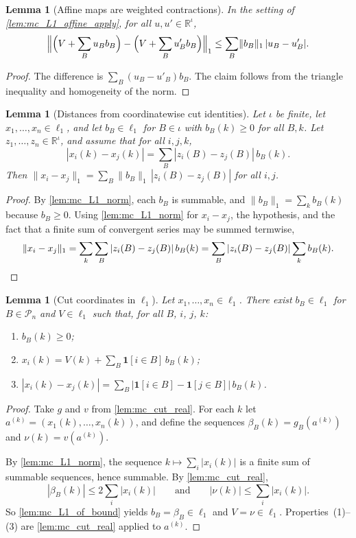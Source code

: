 \documentclass[11pt]{article}
\newtheorem{lemma}[theorem]{Lemma}
\theoremstyle{definition}
\theoremstyle{remark}
\newcommand{\R}{\mathbb{R}}
\newcommand{\Pn}{\mathcal{P}_n}
\newcommand{\one}{\mathbf{1}}
\newcommand{\lnorm}[1]{\lVert #1\rVert_{1}}
\begin{document}
\begin{lemma}[Affine maps are weighted contractions]\label{lem:mc_L1_affine_contr}
In the setting of \cref{lem:mc_L1_affine_apply}, for all $u,u'\in\R^\iota$,
\[
\Bigl\|\Bigl(V+\sum_Bu_Bb_B\Bigr)-\Bigl(V+\sum_Bu'_Bb_B\Bigr)\Bigr\|_1\le\sum_B\lnorm{b_B}\,|u_B-u'_B| .
\]
\end{lemma}
\begin{proof}
The difference is $\sum_B(u_B-u'_B)b_B$. The claim follows from the triangle inequality and homogeneity of the norm.
\end{proof}

\begin{lemma}[Distances from coordinatewise cut identities]\label{lem:mc_L1_dist_eq}
Let $\iota$ be finite, let $x_1,\dots,x_n\in\ell_1$, and let $b_B\in\ell_1$ for $B\in\iota$ with $b_B(k)\ge0$ for all $B,k$. Let $z_1,\dots,z_n\in\R^\iota$, and assume that for all $i,j,k$,
\[
|x_i(k)-x_j(k)|=\sum_B|z_i(B)-z_j(B)|\,b_B(k).
\]
Then $\lnorm{x_i-x_j}=\sum_B\lnorm{b_B}\,|z_i(B)-z_j(B)|$ for all $i,j$.
\end{lemma}
\begin{proof}
By \cref{lem:mc_L1_norm}, each $b_B$ is summable, and $\lnorm{b_B}=\sum_kb_B(k)$ because $b_B\ge0$. Using \cref{lem:mc_L1_norm} for $x_i-x_j$, the hypothesis, and the fact that a finite sum of convergent series may be summed termwise,
\[
\lnorm{x_i-x_j}=\sum_k\sum_B|z_i(B)-z_j(B)|\,b_B(k)=\sum_B|z_i(B)-z_j(B)|\sum_kb_B(k). \qedhere
\]
\end{proof}

\begin{lemma}[Cut coordinates in $\ell_1$]\label{lem:mc_cut_coords}
Let $x_1,\dots,x_n\in\ell_1$. There exist $b_B\in\ell_1$ for $B\in\Pn$ and $V\in\ell_1$ such that, for all $B$, $i$, $j$, $k$:
\begin{enumerate}
\item $b_B(k)\ge0$;
\item $x_i(k)=V(k)+\sum_B\one[i\in B]\,b_B(k)$;
\item $|x_i(k)-x_j(k)|=\sum_B\bigl|\one[i\in B]-\one[j\in B]\bigr|\,b_B(k)$.
\end{enumerate}
\end{lemma}
\begin{proof}
Take $g$ and $v$ from \cref{lem:mc_cut_real}. For each $k$ let $a^{(k)}=(x_1(k),\dots,x_n(k))$, and define the sequences $\beta_B(k)=g_B(a^{(k)})$ and $\nu(k)=v(a^{(k)})$.

By \cref{lem:mc_L1_norm}, the sequence $k\mapsto\sum_i|x_i(k)|$ is a finite sum of summable sequences, hence summable. By \cref{lem:mc_cut_real},
\[
|\beta_B(k)|\le2\sum_i|x_i(k)|\qquad\text{and}\qquad|\nu(k)|\le\sum_i|x_i(k)| .
\]
So \cref{lem:mc_L1_of_bound} yields $b_B=\beta_B\in\ell_1$ and $V=\nu\in\ell_1$. Properties~(1)--(3) are \cref{lem:mc_cut_real} applied to $a^{(k)}$.
\end{proof}
\end{document}
